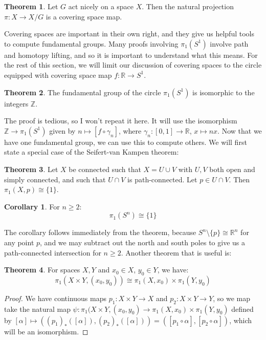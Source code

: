 \documentclass[11pt, oneside]{amsart}   	%
\theoremstyle{definition}
\newtheorem{theorem}{Theorem}[section]
\newtheorem{corollary}{Corollary}[theorem]
\begin{document}
	\begin{theorem}
		Let $G$ act nicely on a space $X$. Then the natural projection $\pi : X\rightarrow X / G$ is a covering space map.
	\end{theorem}
	
	Covering spaces are important in their own right, and they give us helpful tools to compute fundamental groups. Many proofs involving $\pi_1(S^1)$ involve 
	path and homotopy lifting, and so it is important to understand what this means. For the rest of this section, we will limit our discussion of covering spaces 
	to the circle equipped with covering space map $f : \mathbb R\rightarrow S^1$. 
	
	\begin{theorem}
		The fundamental group of the circle $\pi_1(S^1)$ is isomorphic to the integers $\mathbb Z$. 
	\end{theorem}
	
	The proof is tedious, so I won't repeat it here. It will use the isomorphism $\mathbb Z\rightarrow\pi_1(S^1)$ given by $n\mapsto [f\circ\gamma_n]$, 
	where $\gamma_n : [0, 1]\rightarrow \mathbb R$, $x\mapsto nx$. Now that we have one fundamental group, we can use this to compute others. We will 
	first state a special case of the Seifert-van Kampen theorem:
	
	\begin{theorem}
		Let $X$ be connected such that $X = U\cup V$ with $U, V$ both open and simply connected, and such that $U\cap V$ is path-connected. Let $p\in 
		U\cap V$. Then $\pi_1(X, p)\cong\{1\}$. 
	\end{theorem}
	
	\begin{corollary}
		For $n\geq 2$:
		$$
			\pi_1(S^n)\cong\{1\}
		$$
	\end{corollary}
	
	The corollary follows immediately from the theorem, because $S^n\setminus\{p\}\cong\mathbb R^n$ for any point $p$, and we may subtract out the north and 
	south poles to give us a path-connected intersection for $n\geq 2$. Another theorem that is useful is:
	
	\begin{theorem}
		For spaces $X, Y$ and $x_0\in X$, $y_0\in Y$, we have:
		$$
			\pi_1(X\times Y, (x_0, y_0))\cong\pi_1(X, x_0)\times \pi_1(Y, y_0)
		$$
	\end{theorem}
	
	\begin{proof}
		We have continuous maps $p_1 : X\times Y\rightarrow X$ and $p_2 : X\times Y\rightarrow Y$, so we map take the natural map $\psi : \pi_1(X\times Y, 
		(x_0, y_0)\rightarrow\pi_1(X, x_0)\times \pi_1(Y, y_0)$ defined by $[\alpha]\mapsto ((p_1)_*([\alpha]), (p_2)_*([\alpha])) = ([p_1\circ\alpha], [p_2\circ
		\alpha])$, which will be an isomorphism.
	\end{proof}
	
\end{document}
